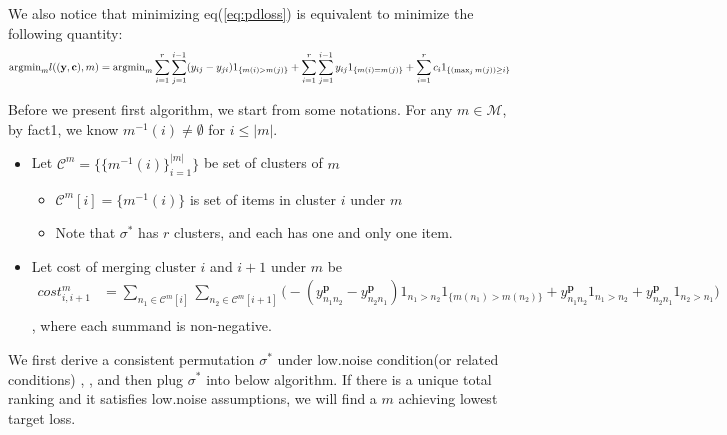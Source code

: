 We also notice that minimizing eq(\ref{eq:pdloss}) is equivalent to minimize the following quantity:
	\begin{equation*}
	\text{argmin}_ml((\mathbf{y},\mathbf{c}),  m)= \text{argmin}_m\sum\limits_{i=1}^r\sum\limits_{j=1}^{i-1}(y_{ij}-y_{ji})1_{\{m(i)> m(j)\}}+\sum\limits_{i=1}^r\sum\limits_{j=1}^{i-1}y_{ij}1_{\{m(i)= m(j)\}}+\sum\limits_{i=1}^rc_i1_{\{(\max_jm(j))\geq i\}}\\
	\end{equation*} 

Before we present first algorithm, we start from some notations. For any $m\in \mathcal{M}$, by fact1, we know $m^{-1}(i)\not=\emptyset$ for $i\leq |m|$. 
\begin{itemize}
	\item Let $\mathcal{C}^m=\{  \{m^{-1}(i)\}_{i=1}^{|m|}     \}$ be set of clusters of $m$
	\begin{itemize}
		\item $\mathcal{C}^m[i]= \{m^{-1}(i)\}$ is set of items in cluster $i$ under $m$
		\item Note that $\sigma^*$ has $r$ clusters, and each has one  and only one item.
	\end{itemize}
\item Let cost of merging cluster $i$ and $i+1$ under $m$ be \begin{equation}\label{eq:cost}
\begin{split}
cost^m_{i, i+1}&=\sum\limits_{n_1\in \mathcal{C}^m[i]}\sum\limits_{n_2\in \mathcal{C}^m[i+1]}\bigg(-(y_{n_1n_2}^\mathbf{p}-y_{n_2n_1}^\mathbf{p})1_{n_1>n_2}1_{\{m(n_1)> m(n_2)\}}+y_{n_1n_2}^\mathbf{p}1_{n_1>n_2}+y_{n_2n_1}^\mathbf{p}1_{n_2>n_1}\bigg)\\
\end{split}
\end{equation}
, where each summand is non-negative.
\end{itemize}

	We first derive a consistent permutation $\sigma^*$ under low.noise condition(or related conditions) \cite{ramaswamy2013convex}, \cite{duchi2011}, and then plug $\sigma^*$ into below algorithm. If there is a unique total ranking and it satisfies low.noise assumptions, we will find a $m$ achieving lowest target loss.
	
